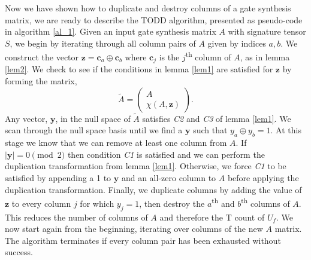 \documentclass[notitlepage]{article}
\theoremstyle{definition}
\theoremstyle{problem}
\theoremstyle{lemma}
\begin{document}
		Now we have shown how to duplicate and destroy columns of a gate synthesis matrix, we are ready to describe the TODD algorithm, presented as pseudo-code in algorithm \ref{al_1}. Given an input gate synthesis matrix $A$ with signature tensor $S$, we begin by iterating through all column pairs of $A$ given by indices $a,b$. We construct the vector $\mathbf{z}=\mathbf{c}_a \oplus \mathbf{c}_b$ where $\mathbf{c}_j$ is the $j$\textsuperscript{th} column of $A$, as in lemma \ref{lem2}. We check to see if the conditions in lemma \ref{lem1} are satisfied for $\mathbf{z}$ by forming the matrix,
		\begin{equation}
		\tilde{A}=\begin{pmatrix}
		A \\ \chi(A,\mathbf{z})
		\end{pmatrix}.
		\end{equation}
		Any vector, $\mathbf{y}$, in the null space of $\tilde{A}$ satisfies \emph{C2} and \emph{C3} of lemma \ref{lem1}. We scan through the null space basis until we find a $\mathbf{y}$ such that $y_a \oplus y_b = 1$. At this stage we know that we can remove at least one column from $A$. If $|\mathbf{y}|=0 \pmod{2}$ then condition \emph{C1} is satisfied and we can perform the duplication transformation from lemma \ref{lem1}. Otherwise, we force \emph{C1} to be satisfied by appending a 1 to $\mathbf{y}$ and an all-zero column to $A$ before applying the duplication transformation. Finally, we duplicate columns by adding the value of $\mathbf{z}$ to every column $j$ for which $y_j = 1$, then destroy the $a$\textsuperscript{th} and $b$\textsuperscript{th} columns of $A$. This reduces the number of columns of $A$ and therefore the T count of $U_f$. We now start again from the beginning, iterating over columns of the new $A$ matrix. The algorithm terminates if every column pair has been exhausted without success.		
\end{document}
